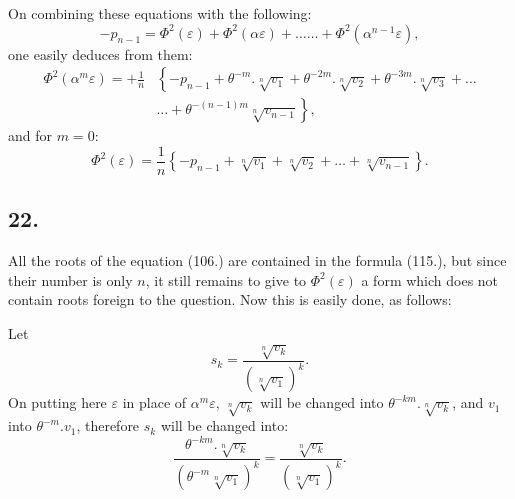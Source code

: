 \documentclass{article}
\begin{document}
On combining these equations with the following:
\[ -p_{n-1}=\Phi^{2}(\varepsilon)+\Phi^{2}(\alpha\varepsilon)+\ldots\ldots+\Phi^{2}(\alpha^{n-1}\varepsilon), \]
one easily deduces from them:
\[ \begin{aligned}
\Phi^{2}(\alpha^{m}\varepsilon)=+\frac{1}{n}&\left\{-p_{n-1}+\theta^{-m}.\sqrt[n]{v_{1}}+\theta^{-2m}.\sqrt[n]{v_{2}}+\theta^{-3m}.\sqrt[n]{v_{3}}+\ldots\right.\\
&\left.\ldots+\theta^{-(n-1)m}\sqrt[n]{v_{n-1}}\right\},
\end{aligned} \tag{114.} \]
and for $m=0$:
\[ \Phi^{2}(\varepsilon)=\frac{1}{n}\left\{-p_{n-1}+\sqrt[n]{v_{1}}+\sqrt[n]{v_{2}}+\ldots+\sqrt[n]{v_{n-1}}\right\}. \tag{115.} \]


\subsection*{22.}

All the roots of the equation (106.) are contained in the formula (115.), but since their number is only $n$, it still remains to give to $\Phi^{2}(\varepsilon)$ a form which does not contain roots foreign to the question. Now this is easily done, as follows:

Let
\[ s_{k}=\frac{\sqrt[n]{v_{k}}}{(\sqrt[n]{v_{1}})^{k}}. \]
On putting here $\varepsilon$ in place of $\alpha^{m}\varepsilon$, $\sqrt[n]{v_{k}}$ will be changed into $\theta^{-km}.\sqrt[n]{v_{k}}$, and $v_{1}$ into $\theta^{-m}.v_{1}$, therefore $s_{k}$ will be changed into:
\[ \frac{\theta^{-km}.\sqrt[n]{v_{k}}}{(\theta^{-m}\sqrt[n]{v_{1}})^{k}}=\frac{\sqrt[n]{v_{k}}}{(\sqrt[n]{v_{1}})^{k}}. \]
\end{document}
